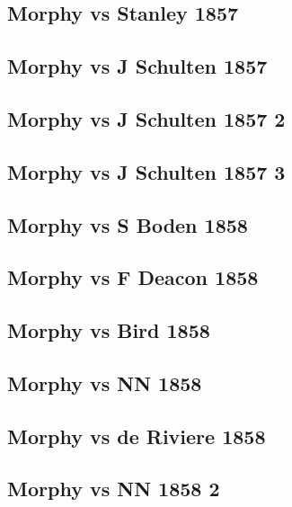 \documentclass[]{book}
\begin{document}
\subsection{Morphy vs Stanley 1857}\label{morphy-vs-stanley-1857}

\subsection{Morphy vs J Schulten
1857}\label{morphy-vs-j-schulten-1857-1}

\subsection{Morphy vs J Schulten 1857
2}\label{morphy-vs-j-schulten-1857-2}

\subsection{Morphy vs J Schulten 1857
3}\label{morphy-vs-j-schulten-1857-3}

\subsection{Morphy vs S Boden 1858}\label{morphy-vs-s-boden-1858}

\subsection{Morphy vs F Deacon 1858}\label{morphy-vs-f-deacon-1858}

\subsection{Morphy vs Bird 1858}\label{morphy-vs-bird-1858}

\subsection{Morphy vs NN 1858}\label{morphy-vs-nn-1858}

\subsection{Morphy vs de Riviere 1858}\label{morphy-vs-de-riviere-1858}

\subsection{Morphy vs NN 1858 2}\label{morphy-vs-nn-1858-2}
\end{document}
